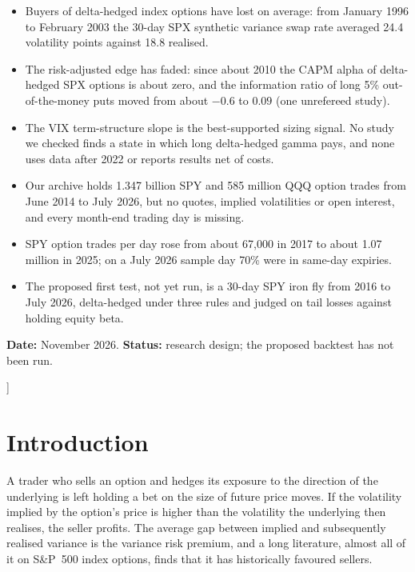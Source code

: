 \documentclass[10pt, a4paper, twocolumn]{article}
\newenvironment{keyfindings}
  {\begin{tcolorbox}[enhanced, colback=qbox, colframe=qnavy, boxrule=0pt, leftrule=2.5pt,
     arc=0pt, left=6pt, right=6pt, top=4pt, bottom=4pt, fontupper=\small,
     title={\small\bfseries Key findings}, coltitle=qnavy, colbacktitle=qbox, attach title to upper={\par\vspace{2pt}}]
   \begin{itemize}[nosep, leftmargin=*, label={\color{qnavy}\textbullet}]}
  {\end{itemize}\end{tcolorbox}}
\begin{document}
{\begin{center}
\vspace{0.6em}
\begin{minipage}{0.92\textwidth}
\begin{keyfindings}
\item Buyers of delta-hedged index options have lost on average: from January 1996 to February 2003 the 30-day SPX synthetic variance swap rate averaged 24.4 volatility points against 18.8 realised.
\item The risk-adjusted edge has faded: since about 2010 the CAPM alpha of delta-hedged SPX options is about zero, and the information ratio of long 5\% out-of-the-money puts moved from about $-0.6$ to $0.09$ (one unrefereed study).
\item The VIX term-structure slope is the best-supported sizing signal. No study we checked finds a state in which long delta-hedged gamma pays, and none uses data after 2022 or reports results net of costs.
\item Our archive holds 1.347 billion SPY and 585 million QQQ option trades from June 2014 to July 2026, but no quotes, implied volatilities or open interest, and every month-end trading day is missing.
\item SPY option trades per day rose from about 67,000 in 2017 to about 1.07 million in 2025; on a July 2026 sample day 70\% were in same-day expiries.
\item The proposed first test, not yet run, is a 30-day SPY iron fly from 2016 to July 2026, delta-hedged under three rules and judged on tail losses against holding equity beta.
\end{keyfindings}
\end{minipage}

\vspace{0.3em}
{\footnotesize \textbf{Date:} November 2026. \textbf{Status:} research design; the proposed backtest has not been run.}
\end{center}
\vspace{1em}
}]

\section{Introduction}
\label{sec:intro}

A trader who sells an option and hedges its exposure to the direction of the underlying is left holding a bet on the size of future price moves. If the volatility implied by the option's price is higher than the volatility the underlying then realises, the seller profits. The average gap between implied and subsequently realised variance is the variance risk premium, and a long literature, almost all of it on S\&P~500 index options, finds that it has historically favoured sellers.
\end{document}
